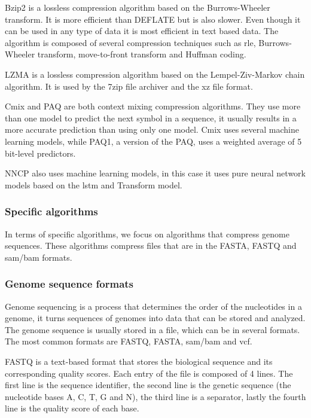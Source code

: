 Bzip2 is a lossless compression algorithm based on the Burrows-Wheeler transform. It is more efficient than DEFLATE but is also slower. Even though it can be used in any type of data it is most efficient in text based data. The algorithm is composed of several compression techniques such as \ac{rle}, Burrows-Wheeler transform, move-to-front transform and Huffman coding.

LZMA is a lossless compression algorithm based on the Lempel-Ziv-Markov chain algorithm. It is used by the 7zip file archiver and the xz file format.

Cmix and PAQ are both context mixing compression algorithms. They use more than one model to predict the next symbol in a sequence, it usually results in a more accurate prediction than using only one model. Cmix uses several machine learning models, while PAQ1, a version of the PAQ, uses a weighted average of 5 bit-level predictors.

NNCP also uses machine learning models, in this case it uses pure neural network models based on the \ac{lstm} and Transform model.

\subsubsection{Specific algorithms}

In terms of specific algorithms, we focus on algorithms that compress genome sequences. These algorithms compress files that are in the FASTA, FASTQ and \ac{sam}/\ac{bam} formats.

\subsubsection{Genome sequence formats}

Genome sequencing is a process that determines the order of the nucleotides in a genome, it turns sequences of genomes into data that can be stored and analyzed. The genome sequence is usually stored in a file, which can be in several formats. The most common formats are FASTQ, FASTA, \ac{sam}/\ac{bam} and \ac{vcf}.

FASTQ is a text-based format that stores the biological sequence and its corresponding quality scores. Each entry of the file is composed of 4 lines. The first line is the sequence identifier, the second line is the genetic sequence (the nucleotide bases A, C, T, G and N), the third line is a separator, lastly the fourth line is the quality score of each base.

